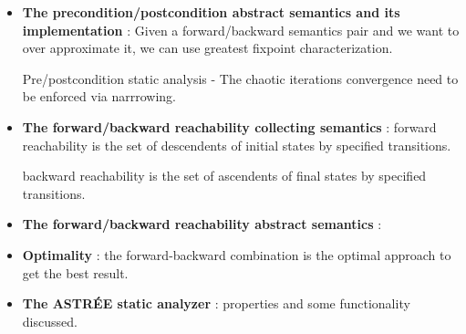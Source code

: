 \begin{itemize}
{	for abstraction we can over-approximate this pair.
	}

	\item{\textbf{The precondition/postcondition abstract semantics and its implementation} :
	Given a forward/backward semantics pair and we want to over approximate it, we can use greatest fixpoint characterization.

	
	Pre/postcondition static analysis - The chaotic iterations convergence need to be enforced via narrrowing. 
	}

	\item{\textbf{The forward/backward reachability collecting semantics} : forward reachability is the set of descendents of initial states by specified transitions. 

	backward reachability is the set of ascendents of final states by specified transitions. 
	}

	\item{\textbf{The forward/backward reachability abstract semantics} : 
	}

	\item{\textbf{Optimality} : the forward-backward combination is the optimal approach to get the best result.
	}

	\item{\textbf{The ASTRÉE static analyzer} : properties and some functionality discussed.
	}

\end{itemize}